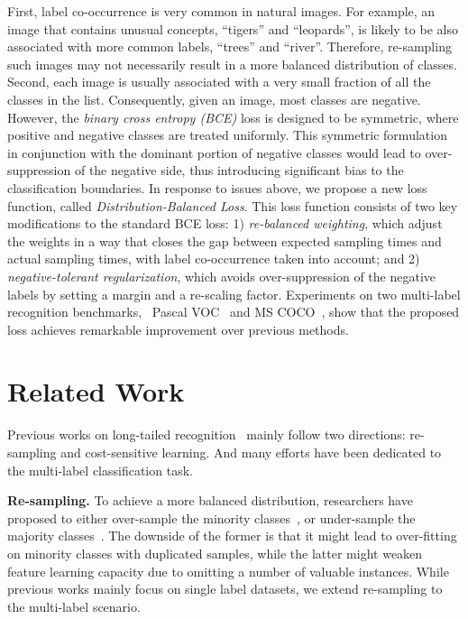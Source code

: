 \documentclass[runningheads]{llncs}
\begin{document}
First, label co-occurrence is very common in natural images. For example, an image that contains unusual concepts, \eg ``tigers'' and ``leopards'', is likely to be also associated with more common labels, \eg ``trees'' and ``river''. Therefore, re-sampling such images may not necessarily result in a more balanced distribution of classes. 
Second, each image is usually associated with a very small fraction of all the classes in the list. Consequently, given an image, most classes are negative. However, the \emph{binary cross entropy (BCE)} loss is designed to be symmetric, where positive and negative classes are treated uniformly. This symmetric formulation in conjunction with the dominant portion of negative classes would lead to over-suppression of the negative side, thus introducing significant bias to the classification boundaries.  
In response to issues above, we propose a new loss function, called \emph{Distribution-Balanced Loss}. This loss function consists of two key modifications to the standard BCE loss: 1) \emph{re-balanced weighting}, which adjust the weights in a way that closes the gap between expected sampling times and actual sampling times, with label co-occurrence taken into account; and 2) \emph{negative-tolerant regularization}, which avoids over-suppression of the negative labels by setting a margin and a re-scaling factor. Experiments on two multi-label recognition benchmarks, \ie~Pascal VOC~\cite{Everingham2015voc} and MS COCO~\cite{lin2014coco}, show that the proposed loss achieves remarkable improvement over previous methods.














%
 \section{Related Work}
\label{sec:related}
Previous works on long-tailed recognition~\cite{wang2017learning,liu2019largescale,kang2020decoupling} mainly follow two directions: re-sampling and cost-sensitive learning. And many efforts have been dedicated to the multi-label classification task. 

\noindent\textbf{Re-sampling.}
To achieve a more balanced distribution, researchers have proposed to either over-sample the minority classes~\cite{shen2016relay,byrd2018effect,buda2018systematic}, or under-sample the majority classes~\cite{japkowicz2002class,he2009learning,buda2018systematic}. The downside of the former is that it might lead to over-fitting on minority classes with duplicated samples, while the latter might weaken feature learning capacity due to omitting a number of valuable instances.
While previous works mainly focus on single label datasets, we extend re-sampling to the multi-label scenario. 
\end{document}
